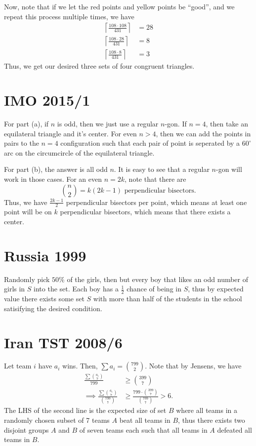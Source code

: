 \documentclass[11pt]{scrartcl}
\begin{document}
Now, note that if we let the red points and yellow points be ``good'', and we repeat this process multiple times, we have
\begin{align*}
\left \lceil \frac{108 \cdot 108}{431} \right \rceil &= 28 \\
\left \lceil \frac{108 \cdot 28}{431} \right \rceil &= 8 \\
\left \lceil \frac{108 \cdot 8}{431} \right \rceil &= 3
\end{align*}
Thus, we get our desired three sets of four congruent triangles. 

\section{IMO 2015/1}
For part (a), if $n$ is odd, then we just use a regular $n$-gon. If $n=4$, then take an equilateral triangle and it's center. For even $n > 4$, then we can add the points in pairs to the $n=4$ configuration such that each pair of point is seperated by a $60^\circ$ arc on the circumcircle of the equilateral triangle. 

For part (b), the answer is all odd $n$. It is easy to see that a regular $n$-gon will work in those cases. For an even $n=2k$, note that there are 
\[\binom{n}{2} = k(2k-1) \text{ perpendicular bisectors.}\]
Thus, we have $\frac{2k-1}{2}$ perpendicular bisectors per point, which means at least one point will be on $k$ perpendicular bisectors, which means that there exists a center. 

\section{Russia 1999}
Randomly pick $50\%$ of the girls, then but every boy that likes an odd number of girls in $S$ into the set. Each boy has a $\frac 12$ chance of being in $S$, thus by expected value there exists some set $S$ with more than half of the students in the school satisifying the desired condition.

\section{Iran TST 2008/6}
Let team $i$ have $a_i$ wins. Then, $\sum a_i = \binom{799}{2}$. Note that by Jensens, we have
\begin{align*}
\frac{\sum \binom{a_i}{7}}{799} &\geq \binom{399}{7} \\
\implies \frac{\sum \binom{a_i}{7}}{\binom{799}{7}} &\geq \frac{799 \cdot \binom{399}{7}}{\binom{799}{7}} > 6.
\end{align*}
The LHS of the second line is the expected size of set $B$ where all teams in a randomly chosen subset of 7 teams $A$ beat all teams in $B$, thus there exists two disjoint groups $A$ and $B$ of seven teams each such that all teams in $A$ defeated all teams in $B$.
\end{document}
